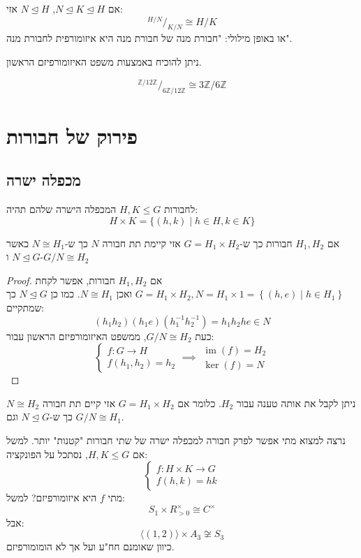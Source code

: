 \documentclass{tstextbook}
\begin{document}
\begin{theorem}
אם \(N\trianglelefteq K\trianglelefteq H\), \(N\trianglelefteq H\) אזי:
$$^{H / N }/ _{ K  / N } \cong H/K$$
או באופן מילולי: "חבורת מנה של חבורת מנה היא איזומורפית לחבורת מנה".

\end{theorem}
ניתן להוכיח באמצעות משפט האיזומורפיזם הראשון.

\begin{example}
$$^{\mathbb{Z} / 12 \mathbb{Z} }
/ _{ 6\mathbb{Z}  / 12 \mathbb{Z} } \cong 3 \mathbb{Z}  / 6\mathbb{Z}$$

\end{example}
\section{פירוק של חבורות}

\subsection{מכפלה ישרה}

\begin{definition}
לחבורות \(H,K\leq G\) המכפלה הישרה שלהם תהיה:
$$ H\times K=\{(h,k)\mid h\in H,k\in K\}$$

\end{definition}
\begin{proposition}
אם \(H_{1}, H_{2}\) חבורות כך ש-\(G=H_{1}\times H_{2}\) אזי קיימת תת חבורה \(N\) כך ש-\(N\cong H_{1}\) כאשר \(N\trianglelefteq G\) ו-\(G / N \cong H_{2}\)

\end{proposition}
\begin{proof}
אם \(H_{1}, H_{2}\) חבורות, אפשר לקחת \(G=H_{1}\times H_{2}, N=H_{1}\times 1=\left\{  (h,e)\mid h\in H_{1}  \right\}\) ואכן \(N\cong H_{1}\). כמו כן \(N\trianglelefteq G\) כך שמתקיים:
$$(h_{1}h_{2})(h_{1}e)(h_{1}^{-1} h_{2}^{-1} )=h_{1}h_{2}he\in N$$
כעת \(G / N \cong H_{2}\), ממשפט האיזומורפיזם הראשון עבור: 
$$\begin{cases}f:G\to H \\f(h_{1},h_{2})=h_{2}\end{cases}\implies \begin{array}{c }\operatorname{im}(f)=H_{2} \\\ker(f)=N 
\end{array}$$

\end{proof}
\begin{corollary}
ניתן לקבל את אותה טענה עבור \(H_{2}\). כלומר אם \(G=H_{1}\times H_{2}\) אזי קיים תת חבורה \(N\cong H_{2}\) כך ש-\(N\trianglelefteq G\) וגם \(G / N \cong H_{1}\).

\end{corollary}
נרצה למצוא מתי אפשר לפרק חבורה למכפלה ישרה של שתי חבורות "קטנות" יותר. למשל אם \(H,K\leq G\), נסתכל על הפונקציה: 
$$\begin{cases}f:H\times K\to G \\f(h,k)=hk
\end{cases}$$
מתי \(f\) היא איזומורפיזם? למשל:
$$S_{1}\times R^{\times}_{>0}\cong C^{\times}$$
אבל:
$$\langle (1,2) \rangle \times A_{3}\not\cong  S_{3}$$
כיוון שאומנם חח"ע ועל אך לא הומומורפיזם.
\end{document}
